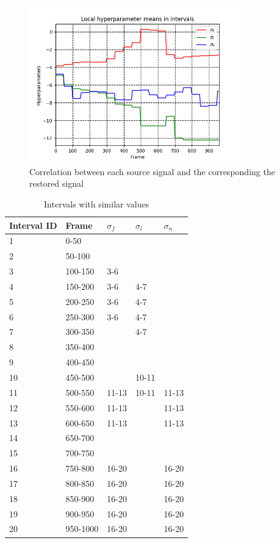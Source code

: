 \documentclass[conference]{IEEEtran}
\begin{document}
\begin{figure}[!t]
	\centering
	\includegraphics[width=3.6in]{interval.png}	
	\caption{Correlation between each source signal and the corresponding the restored signal}
	\label{fig:interval}
\end{figure}

\begin{table}
\caption{Intervals with similar values}
 	\label{table:interval}
\begin{tabular}{ |p{1.5cm}||p{1.2cm}|p{1cm}|p{1cm}|p{1cm}|  }
 \hline
 Interval ID & Frame & $\sigma_f$ & $\sigma_l$ & $\sigma_n$\\
 \hline
	1 & 0-50 	&		&		&		\\
	2 & 50-100 	&		&		&		\\
	3 & 100-150 & 3-6 	&		&		\\
	4 & 150-200 & 3-6 	& 4-7 	&		\\
	5 & 200-250 & 3-6 	& 4-7 	&		\\
	6 & 250-300 & 3-6 	& 4-7 	&		\\
	7 & 300-350 &		& 4-7 	&		\\
	8 & 350-400 &		&		&		\\
	9 & 400-450 &		&		&		\\
	10 & 450-500 &		& 10-11 &		\\
	11 & 500-550 & 11-13 & 10-11 & 11-13\\
	12 & 550-600 & 11-13 &		& 11-13\\
	13 & 600-650 & 11-13 &		& 11-13\\
	14 & 650-700 &		 &		&		\\
	15 & 700-750 &		 &		&		\\
	16 & 750-800 & 16-20 &		& 16-20 \\
	17 & 800-850 & 16-20 &		& 16-20 \\
	18 & 850-900 & 16-20 & 		& 16-20 \\
	19 & 900-950 & 16-20 & 		& 16-20 \\
	20 & 950-1000 & 16-20 &		& 16-20 \\
 \hline
\end{tabular}
\end{table}
\end{document}
